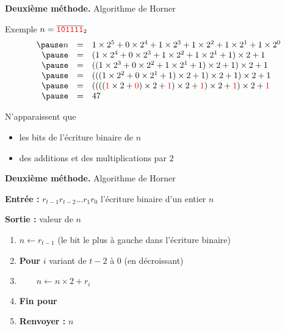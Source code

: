 \begin{frame}



\bigskip
\pause

\textbf{Deuxième méthode.} Algorithme de Horner

\bigskip
\pause
Exemple $n = \overline{{\color{red}\mathtt{101111}}}_2$
\[\begin{array}{rcl}
\pause
n &=& 1\times 2^5 + 0\times 2^4 + 1\times 2^3 + 1\times 2^2 + 1\times 2^1 + 1\times 2^0\\
\pause
&=& (1\times 2^4 + 0\times 2^3 + 1\times 2^2 + 1\times 2^1 + 1)\times 2 + 1\\
\pause
&=& ((1\times 2^3 + 0\times 2^2 + 1\times 2^1 + 1)\times 2 + 1)\times 2 + 1\\
\pause
&=& (((1\times 2^2 + 0\times 2^1 + 1)\times 2 + 1)\times 2 + 1)\times 2 + 1\\
\pause
&=& (((({\color{red}1}\times 2 + {\color{red}0})\times 2 + {\color{red}1})\times 2 + {\color{red}1})\times 2 + {\color{red}1})\times 2 + {\color{red}1} \\
\pause
&=& 47
\end{array}\]

\pause
N'apparaissent que
\begin{itemize}
\pause
\item les bits de l'écriture binaire de $n$
\pause
\item des additions et des multiplications par $2$

\end{itemize}

\end{frame}


\begin{frame}


\bigskip

\textbf{Deuxième méthode.} Algorithme de Horner

\bigskip

\begin{algo}
\textbf{Entrée :} $r_{t-1}r_{t-2}\ldots r_1r_0$ l'écriture binaire d'un entier $n$

\textbf{Sortie :} valeur de $n$

\begin{enumerate}

\item $n\leftarrow r_{t-1}$ (le bit le plus à gauche dans l'écriture binaire)
\item \textbf{Pour} $i$ variant de $t-2$ à 0 (en décroissant)
\item $\qquad n\leftarrow n\times 2 + r_{i}$
\item \textbf{Fin pour}
\item \textbf{Renvoyer :} $n$
\end{enumerate}
\end{algo}

\end{frame}




